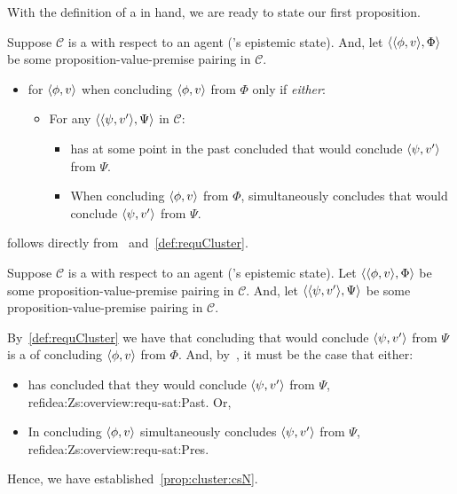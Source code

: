 \begin{note}
  With the definition of a \cluster{} in hand, we are ready to state our first proposition.

  \begin{proposition}
    \label{prop:cluster:csN}
    Suppose \(\mathcal{C}\) is a  with respect to an agent \vAgent{}('s epistemic state).
    And, let \(\langle \langle \phi, v \rangle, \Phi \rangle\) be some proposition-value-premise pairing in \(\mathcal{C}\).

    \begin{itemize}
    \item
      \vAgent{} \csV{} for \(\langle \phi, v \rangle\) when concluding \(\langle \phi, v \rangle\) from \(\Phi\) only if \emph{either}:
      \begin{itemize}
      \item
        For any \(\langle \langle \psi, v' \rangle, \Psi \rangle\) in \(\mathcal{C}\):
        \begin{itemize}
        \item \vAgent{} has at some point in the past concluded that \vAgent{} would conclude \(\langle \psi, v' \rangle\) from \(\Psi\).
        \item
          When concluding \(\langle \phi, v \rangle\) from \(\Phi\), \vAgent{} simultaneously concludes that \vAgent{} would conclude \(\langle \psi, v' \rangle\) from \(\Psi\).
        \end{itemize}
      \end{itemize}
    \end{itemize}
  \end{proposition}

   follows directly from~\iZS{} and~\autoref{def:requCluster}.

  \begin{argument}
    Suppose \(\mathcal{C}\) is a  with respect to an agent \vAgent{}('s epistemic state).
    Let \(\langle \langle \phi, v \rangle, \Phi \rangle\) be some proposition-value-premise pairing in \(\mathcal{C}\).
    And, let \(\langle \langle \psi, v' \rangle, \Psi \rangle\) be some proposition-value-premise pairing in \(\mathcal{C}\).

    By~\autoref{def:requCluster} we have that \vAgent{} concluding that \vAgent{} would conclude \(\langle \psi, v' \rangle\) from \(\Psi\) is a \requ{} of concluding \(\langle \phi, v \rangle\) from \(\Phi\).
    And, by~\iZS{}, it must be the case that either:
    \begin{itemize}
    \item
      \vAgent{} has concluded that they would conclude \(\langle \psi, v' \rangle\) from \(\Psi\), ref{idea:Zs:overview:requ-sat:Past}.
      Or,
    \item
      In concluding \(\langle \phi, v \rangle\) \vAgent{} simultaneously concludes \(\langle \psi, v' \rangle\) from \(\Psi\), ref{idea:Zs:overview:requ-sat:Pres}.
    \end{itemize}
    Hence, we have established~\ref{prop:cluster:csN}.
  \end{argument}
\end{note}

